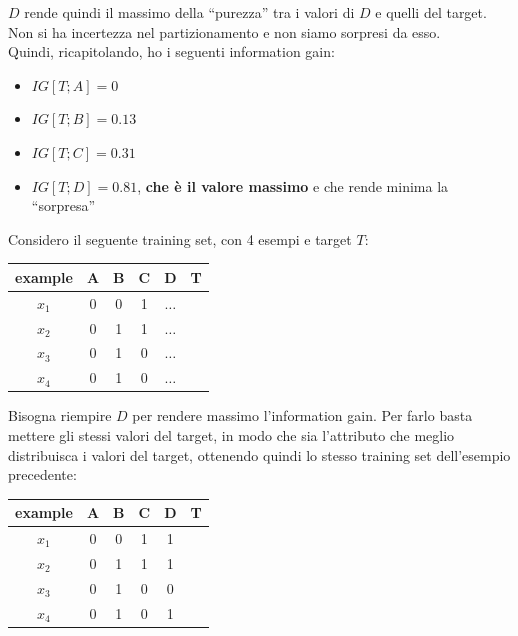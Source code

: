 \begin{esempio}
\begin{figure}[H]
  \end{figure}
  $D$ rende quindi il massimo della ``purezza'' tra i valori di $D$ e quelli del
  target. Non si ha incertezza nel partizionamento e non siamo sorpresi da esso.\\
  Quindi, ricapitolando, ho i seguenti information gain:
  \begin{itemize}
    \item $IG[T;A]=0$
    \item $IG[T;B]=0.13$
    \item $IG[T;C]=0.31$
    \item $IG[T;D]=0.81$, \textbf{che è il valore massimo} e che rende minima la
    ``sorpresa''
  \end{itemize}
\end{esempio}
\begin{esempio}
  Considero il seguente training set, con 4 esempi e target $T$:
  \begin{table}[H]
    \centering
    \begin{tabular}{c|c|c|c|c|c}
      example & A & B & C & D & T\\
      \hline
      $x_1$ & 0 & 0 & 1 & $\ldots$ & \color{darkgreen}{1}\\
      $x_2$ & 0 & 1 & 1 & $\ldots$ & \color{darkgreen}{1}\\
      $x_3$ & 0 & 1 & 0 & $\ldots$ & \color{red}{0}\\
      $x_4$ & 0 & 1 & 0 & $\ldots$ & \color{darkgreen}{1}\\
    \end{tabular}
  \end{table}
  Bisogna riempire $D$ per rendere massimo l'information gain.
  \newpage
  Per farlo basta mettere gli stessi valori del target, in modo che sia
  l'attributo che meglio distribuisca i valori del target, ottenendo quindi lo
  stesso training set dell'esempio precedente:
  \begin{table}[H]
    \centering
    \begin{tabular}{c|c|c|c|c|c}
      example & A & B & C & D & T\\
      \hline
      $x_1$ & 0 & 0 & 1 & 1 & \color{darkgreen}{1}\\
      $x_2$ & 0 & 1 & 1 & 1 & \color{darkgreen}{1}\\
      $x_3$ & 0 & 1 & 0 & 0 & \color{red}{0}\\
      $x_4$ & 0 & 1 & 0 & 1 & \color{darkgreen}{1}\\
    \end{tabular}

\end{table}
\end{esempio}

